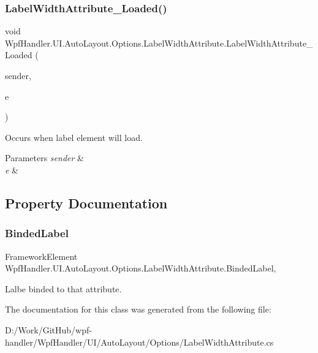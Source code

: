 \subsubsection{\texorpdfstring{Label\+Width\+Attribute\+\_\+\+Loaded()}{LabelWidthAttribute\_Loaded()}}
{\footnotesize\ttfamily void Wpf\+Handler.\+U\+I.\+Auto\+Layout.\+Options.\+Label\+Width\+Attribute.\+Label\+Width\+Attribute\+\_\+\+Loaded (\begin{DoxyParamCaption}\item[{object}]{sender,  }\item[{Routed\+Event\+Args}]{e }\end{DoxyParamCaption})\hspace{0.3cm}{\ttfamily [private]}}



Occurs when label element will load. 


\begin{DoxyParams}{Parameters}
{\em sender} & \\
\hline
{\em e} & \\
\hline
\end{DoxyParams}


\subsection{Property Documentation}
\mbox{\label{class_wpf_handler_1_1_u_i_1_1_auto_layout_1_1_options_1_1_label_width_attribute_ae3a052219f7ebdf78dc6e47962a9f8b9}} 
\subsubsection{\texorpdfstring{Binded\+Label}{BindedLabel}}
{\footnotesize\ttfamily Framework\+Element Wpf\+Handler.\+U\+I.\+Auto\+Layout.\+Options.\+Label\+Width\+Attribute.\+Binded\+Label\hspace{0.3cm}{\ttfamily [get]}, {}}



Lalbe binded to that attribute. 



The documentation for this class was generated from the following file\+:\begin{DoxyCompactItemize}
\item 
D\+:/\+Work/\+Git\+Hub/wpf-\/handler/\+Wpf\+Handler/\+U\+I/\+Auto\+Layout/\+Options/Label\+Width\+Attribute.\+cs\end{DoxyCompactItemize}
